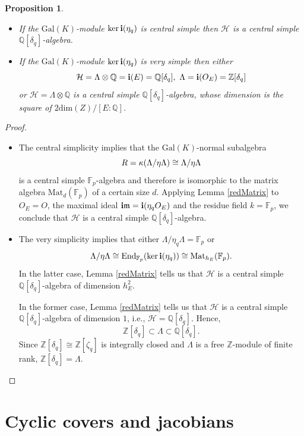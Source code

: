 \documentclass[12pt,a4paper,reqno]{amsart}
\def\Q{{\mathbb Q}}
\def\Z{{\mathbb Z}}
\def\F{{\mathbb F}}
\def\Gal{\mathrm{Gal}}
\def\End{\mathrm{End}}
\def\Mat{\mathrm{Mat}}
\def\dim{\mathrm{dim}}
\newtheorem{prop}[thm]{Proposition}
\theoremstyle{definition}
\begin{document}
\begin{prop}
\label{normalLambdaDim}
\begin{itemize}
\item[(i)]
If the $\Gal(K)$-module $\ker {\bf i}(\eta_q)$ is central simple then 
$\mathcal{H}$ is a central simple $\Q[\delta_q]$-algebra.

\item[(ii)]
If the $\Gal(K)$-module $\ker {\bf i}(\eta_q)$ is very simple then either
$$\mathcal{H}=\Lambda\otimes\Q={\bf i}(E)=\Q[\delta_q], \ \Lambda={\bf i}(O_E)=\Z[\delta_q]$$ or 
$\mathcal{H}=\Lambda\otimes\Q$ is a central simple $\Q[\delta_q]$-algebra, whose dimension is  the square of $2\dim(Z)/[E:\Q]$.
\end{itemize}
\end{prop}

\begin{proof}
\begin{itemize}
\item[(i)]
The central simplicity implies that the $\Gal(K)$-normal subalgebra 
$$R={\bf \kappa}(\Lambda/\eta\Lambda)\cong \Lambda/\eta\Lambda$$
 is a central simple $\F_p$-algebra and therefore 
is isomorphic to the matrix algebra $\Mat_d(\F_p)$ of a certain size $d$.  Applying Lemma \ref{redMatrix}
to $O_E=O$, the maximal ideal ${\bf i}{\mathfrak{m}}={\bf i}(\eta_q O_E)$ and the residue field $k=\F_p$, we conclude
that $\mathcal{H}$ is a central simple $\Q[\delta_q]$-algebra.
\item[(ii)]
The very simplicity implies that either $\Lambda/\eta_q\Lambda=\F_p$ or
$$\Lambda/\eta\Lambda \cong \End_{\F_p}(\ker {\bf i}(\eta_q)) \cong \Mat_{h_E}(\F_p).$$
In the latter case, Lemma \ref{redMatrix} tells us that $\mathcal{H}$ is a central simple $\Q[\delta_q]$-algebra of dimension $h_E^2$.

In the former case, Lemma \ref{redMatrix} tells us that $\mathcal{H}$ is a central simple $\Q[\delta_q]$-algebra of dimension $1$,
i.e.,  $\mathcal{H}=\Q[\delta_q]$. Hence,
$$\Z[\delta_q] \subset \Lambda \subset \Q[\delta_q].$$
Since $\Z[\delta_q]\cong \Z[\zeta_q]$ is integrally closed and $\Lambda$ is a free $\Z$-module of finite rank, $\Z[\delta_q] = \Lambda$.

\end{itemize}

\end{proof}

\section{Cyclic covers and jacobians}
\label{Prelim}
\end{document}
